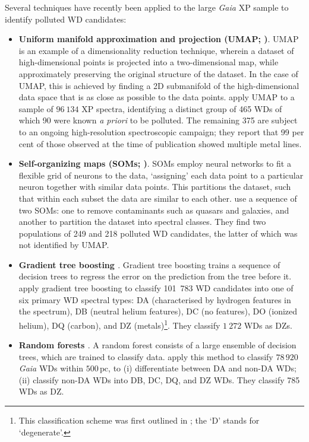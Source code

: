 \documentclass[fleqn,usenatbib]{rasti}
\begin{document}
Several techniques have recently been applied to the large \textit{Gaia} XP sample to identify polluted WD candidates:
\begin{itemize}
\item \textbf{Uniform manifold approximation and projection (UMAP; \citealt{mcinnes18})}.
UMAP is an example of a dimensionality reduction technique, wherein a dataset of high-dimensional points is projected into a two-dimensional map, while approximately preserving the original structure of the dataset.
In the case of UMAP, this is achieved by finding a 2D submanifold of the high-dimensional data space that is as close as possible to the data points. 
\citet{kao24} apply UMAP to a sample of $96~134$ XP spectra, identifying a distinct group of 465 WDs of which 90 were known \textit{a priori} to be polluted.
The remaining 375 are subject to an ongoing high-resolution spectroscopic campaign; they report that 99 per cent of those observed at the time of publication showed multiple metal lines.
\item \textbf{Self-organizing maps (SOMs; \citealt{kohonen82})}.
SOMs employ neural networks to fit a flexible grid of neurons to the data, `assigning' each data point to a particular neuron together with similar data points.
This partitions the dataset, such that within each subset the data are similar to each other.
\citet{perezcouto24} use a sequence of two SOMs: one to remove contaminants such as quasars and galaxies, and another to partition the dataset into spectral classes.
They find two populations of 249 and 218 polluted WD candidates, the latter of which was not identified by UMAP.
\item \textbf{Gradient tree boosting \citep{friedman01}}.
Gradient tree boosting trains a sequence of decision trees to regress the error on the prediction from the tree before it.
\citet{vincent24} apply gradient tree boosting to classify 101~783 WD candidates into one of six primary WD spectral types:
DA (characterised by hydrogen features in the spectrum),
DB (neutral helium features),
DC (no features),
DO (ionized helium),
DQ (carbon),
and DZ (metals)\footnote{
    This classification scheme was first outlined in \citet{sion83}; the `D' stands for `degenerate'.
}.
They classify $1~272$ WDs as DZs.
\item \textbf{Random forests \citep{breiman01}}.
A random forest consists of a large ensemble of decision trees, which are trained to classify data.
\citet{garciazamora25} apply this method to classify $78\,920$
\textit{Gaia} WDs within $500\,\text{pc}$, to (i) differentiate between DA and non-DA WDs; (ii) classify non-DA WDs into DB, DC, DQ, and DZ WDs.
They classify 785 WDs as DZ.
\end{itemize}
\end{document}
